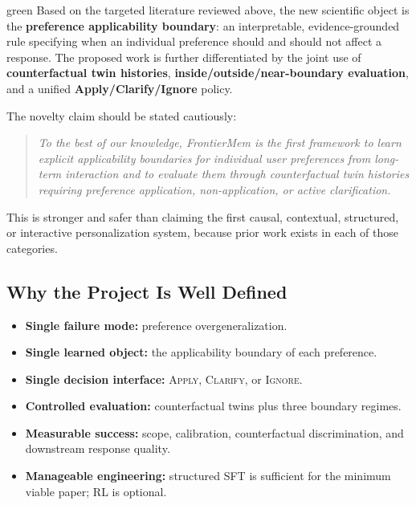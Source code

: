 \documentclass[10.5pt,a4paper]{article}
\begin{document}
\begin{keybox}{green}
Based on the targeted literature reviewed above, the new scientific object is the \textbf{preference applicability boundary}: an interpretable, evidence-grounded rule specifying when an individual preference should and should not affect a response. The proposed work is further differentiated by the joint use of \textbf{counterfactual twin histories}, \textbf{inside/outside/near-boundary evaluation}, and a unified \textbf{Apply/Clarify/Ignore} policy.
\end{keybox}

The novelty claim should be stated cautiously:

\begin{quote}
\emph{To the best of our knowledge, FrontierMem is the first framework to learn explicit applicability boundaries for individual user preferences from long-term interaction and to evaluate them through counterfactual twin histories requiring preference application, non-application, or active clarification.}
\end{quote}

This is stronger and safer than claiming the first causal, contextual, structured, or interactive personalization system, because prior work exists in each of those categories.

\subsection{Why the Project Is Well Defined}
\begin{itemize}
  \item \textbf{Single failure mode:} preference overgeneralization.
  \item \textbf{Single learned object:} the applicability boundary of each preference.
  \item \textbf{Single decision interface:} \textsc{Apply}, \textsc{Clarify}, or \textsc{Ignore}.
  \item \textbf{Controlled evaluation:} counterfactual twins plus three boundary regimes.
  \item \textbf{Measurable success:} scope, calibration, counterfactual discrimination, and downstream response quality.
  \item \textbf{Manageable engineering:} structured SFT is sufficient for the minimum viable paper; RL is optional.
\end{itemize}
\end{document}
